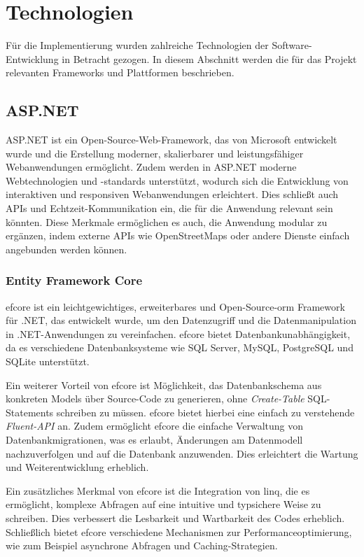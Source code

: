 \section{Technologien}

Für die Implementierung wurden zahlreiche Technologien der Software-Entwicklung in Betracht gezogen. In diesem Abschnitt werden die für das Projekt relevanten Frameworks und Plattformen beschrieben.

\subsection{ASP.NET}

ASP.NET ist ein Open-Source-Web-Framework, das von Microsoft entwickelt wurde und die Erstellung moderner, skalierbarer und leistungsfähiger Webanwendungen ermöglicht. Zudem werden in ASP.NET moderne Webtechnologien und -standards unterstützt, wodurch sich die Entwicklung von interaktiven und responsiven Webanwendungen erleichtert. Dies schließt auch APIs und Echtzeit-Kommunikation ein, die für die Anwendung relevant sein könnten. Diese Merkmale ermöglichen es auch, die Anwendung modular zu ergänzen, indem externe APIs wie OpenStreetMaps oder andere Dienste einfach angebunden werden können.

\subsubsection{Entity Framework Core}

\ac{efcore} ist ein leichtgewichtiges, erweiterbares und Open-Source-\ac{orm} Framework für .NET, das entwickelt wurde, um den Datenzugriff und die Datenmanipulation in .NET-Anwendungen zu vereinfachen. \ac{efcore} bietet Datenbankunabhängigkeit, da es verschiedene Datenbanksysteme wie SQL Server, MySQL, PostgreSQL und SQLite unterstützt.

Ein weiterer Vorteil von \ac{efcore} ist Möglichkeit, das Datenbankschema aus konkreten Models über Source-Code zu generieren, ohne \textit{Create-Table} SQL-Statements schreiben zu müssen. \ac{efcore} bietet hierbei eine einfach zu verstehende \textit{Fluent-API} an. Zudem ermöglicht \ac{efcore} die einfache Verwaltung von Datenbankmigrationen, was es erlaubt, Änderungen am Datenmodell nachzuverfolgen und auf die Datenbank anzuwenden. Dies erleichtert die Wartung und Weiterentwicklung erheblich.

Ein zusätzliches Merkmal von \ac{efcore} ist die Integration von \ac{linq}, die es ermöglicht, komplexe Abfragen auf eine intuitive und typsichere Weise zu schreiben. Dies verbessert die Lesbarkeit und Wartbarkeit des Codes erheblich. Schließlich bietet \ac{efcore} verschiedene Mechanismen zur Performanceoptimierung, wie zum Beispiel asynchrone Abfragen und Caching-Strategien.

